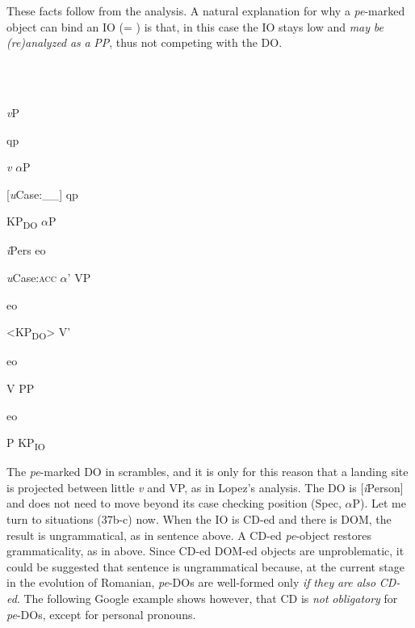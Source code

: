 \documentclass[output=paper,modfonts,nonflat]{langsci/langscibook}
\begin{document}
These facts follow from the analysis. A natural explanation for why a \textit{pe}{}-marked object can bind an IO (= ) is that, in this case the IO stays low and \textit{may} \textit{be} \textit{(re)analyzed} \textit{as} \textit{a} \textit{PP}, thus not competing with the DO. 

\ea%
    \label{ex:key:38}
    \gll\\
        \\
    \glt
    \z

            \textit{v}P

         qp

\textit{v}            ${\alpha}$P

  [\textit{u}Case:\_\_]     qp

      KP\textsubscript{DO}      ${\alpha}$P

      \textit{i}Pers    eo

      \textit{u}Case:\textsc{acc}  ${\alpha}$’      VP

            eo

            <KP\textsubscript{DO}>         V’

              eo

                     V    PP

                 eo

                       P    KP\textsubscript{IO}

The \textit{pe}{}-marked DO in  scrambles, and it is only for this reason that a landing site is projected between little \textit{v} and VP, as in Lopez’s analysis. The DO is [\textit{i}Person] and does not need to move beyond its case checking position (Spec, ${\alpha}$P). Let me turn to situations (37b-c) now. When the IO is CD-ed and there is DOM, the result is ungrammatical, as in sentence  above. A CD-ed \textit{pe}{}-object restores grammaticality, as in  above. Since CD-ed DOM-ed objects are unproblematic, it could be suggested that sentence  is ungrammatical because, at the current stage in the evolution of Romanian, \textit{pe}{}-DOs are well-formed only \textit{if} \textit{they} \textit{are} \textit{also} \textit{CD-ed}. The following Google example shows however, that CD is \textit{not} \textit{obligatory} for \textit{pe}{}-DOs, except for personal pronouns.

\ea%
    \label{ex:key:39}
    \gll\\
        \\
    \glt
    \z
\end{document}
